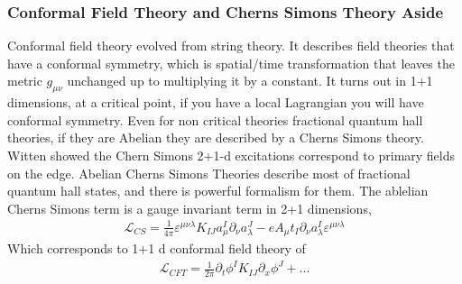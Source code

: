 \subsubsection{Conformal Field Theory and Cherns Simons Theory Aside}
Conformal field theory evolved from string theory. It describes field theories that have a conformal symmetry, which is spatial/time transformation that leaves the metric $g_{\mu \nu}$ unchanged up to multiplying it by a constant. It turns out in 1+1 dimensions, at a critical point, if you have a local Lagrangian you will have conformal symmetry. Even for non critical theories fractional quantum hall theories, if they are Abelian they are described by a Cherns Simons theory. Witten showed the Chern Simons 2+1-d excitations correspond to primary fields on the edge. Abelian Cherns Simons Theories describe most of fractional quantum hall states, and there is powerful formalism for them. The ablelian Cherns Simons term is a gauge invariant term in 2+1 dimensions, 
\begin{align}
\mathcal{L}_{CS} = \frac{1}{4\pi}\varepsilon^{\mu \nu \lambda }K_{IJ}a_\mu^I\partial_\nu a^J_\lambda -e A_\mu t_I \partial_\nu a^I_\lambda \varepsilon^{\mu \nu \lambda }
\end{align}
Which corresponds to 1+1 d conformal field theory of 
\begin{align}
\mathcal{L}_{CFT} = \frac{1}{2\pi}\partial_t\phi^I K_{IJ} \partial_x\phi^J + ...
\end{align}

